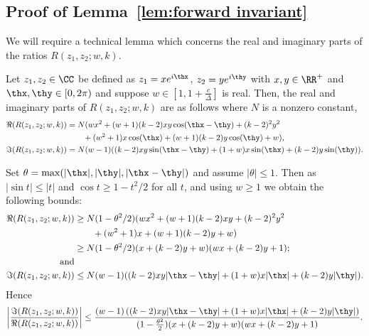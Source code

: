 \subsection{Proof of Lemma~\ref{lem:forward invariant}}
\label{sec:boundcalpha}
%
We will require a technical lemma which concerns the real and imaginary parts of the ratios $R(z_1,z_2;w,k)$.
%
\begin{lemma}
\label{lem:reimparts}
 Let $z_1, z_2 \in \CC$ be defined as $z_1 = xe^{i\thx}$, $z_2 = ye^{i\thy}$ with $x,y \in \RR^+$ and $\thx,\thy \in [0,2\pi)$ and suppose $w \in[1, 1 + \frac{c}{\Delta}]$ is real.
 Then, the real and imaginary parts of $R(z_1,z_2;w,k)$ are as follows where $N$ is a nonzero constant,
 \begin{align}
 \label{eq:realR} \Re(R(z_1,z_2;w,k)) &= N(wx^2+(w+1)(k-2)xy\cos(\thx-\thy) +(k-2)^2y^2 \\ &\qquad+(w^2+1)x\cos(\thx)+(w+1)(k-2)y\cos(\thy) +w), \nonumber\\
 \label{eq:imagR} \Im(R(z_1,z_2;w,k)) &= N (w-1)((k-2)xy\sin(\thx-\thy) +(1+w)x\sin(\thx) +(k-2)y\sin(\thy)).
 \end{align}
\end{lemma}
\begin{remark} 
\label{rem:reimparts}
%
Set $\theta =\max(|\thx|,|\thy|, |\thx-\thy|)$ and assume $|\theta| \le 1$. Then as $|\sin t| \leq |t|$ and $\cos t \geq 1 - t^2/2$ for all $t$, and using $w \geq 1$ we obtain the following bounds:
 \begin{align*}
 \Re(R(z_1,z_2;w,k))  
 &\ge N(1 - \theta^2/2)(wx^2 + (w+1)(k-2)xy +(k-2)^2y^2  \\
&\qquad +(w^2+1)x +(w+1)(k-2)y +w) \\
 &\ge N(1 - \theta^2/2)(x+(k-2)y+w)(wx+(k-2)y+1);\\
 \text{and}\\
  \Im(R(z_1,z_2;w,k)) & \le N (w-1)((k-2)xy|\thx-\thy| +(1+w)x|\thx| +(k-2)y|\thy|).
 \end{align*} 
Hence
\begin{align}
 \bigg|\frac{\Im(R(z_1,z_2;w,k))}{\Re(R(z_1,z_2;w,k))}\bigg| \leq
 \frac{(w-1)\left((k-2)xy|\thx-\thy|+(1+w)x|\thx|+(k-2)y|\thy|\right)}
 {(1 - \frac{\theta^2}{2})(x+(k-2)y+w)(wx+(k-2)y+1)}. 
\label{eq:imreratio}
 \end{align}
\end{remark}
%
